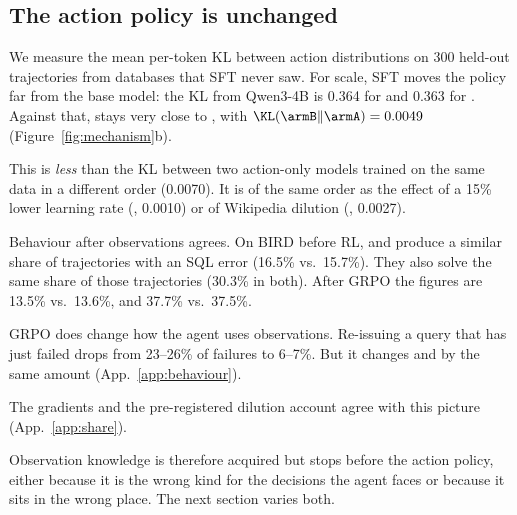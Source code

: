 \subsection{The action policy is unchanged}
\label{sec:equiv}
We measure the mean per-token KL between action distributions on 300 held-out trajectories from databases that SFT never saw. For scale, SFT moves the policy far from the base model: the KL from Qwen3-4B is 0.364 for \armA{} and 0.363 for \armB{}. Against that, \armB{} stays very close to \armA{}, with $\KL(\armB\|\armA)=0.0049$ (Figure~\ref{fig:mechanism}b).

This is \emph{less} than the KL between two action-only models trained on the same data in a different order (0.0070). It is of the same order as the effect of a 15\% lower learning rate (\armC{}, 0.0010) or of Wikipedia dilution (\armD{}, 0.0027).

Behaviour after observations agrees. On BIRD before RL, \armA{} and \armB{} produce a similar share of trajectories with an SQL error (16.5\% vs.\ 15.7\%). They also solve the same share of those trajectories (30.3\% in both). After GRPO the figures are 13.5\% vs.\ 13.6\%, and 37.7\% vs.\ 37.5\%.

GRPO does change how the agent uses observations. Re-issuing a query that has just failed drops from 23--26\% of failures to 6--7\%. But it changes \armA{} and \armB{} by the same amount (App.~\ref{app:behaviour}).

The gradients and the pre-registered dilution account agree with this picture (App.~\ref{app:share}).

Observation knowledge is therefore acquired but stops before the action policy, either because it is the wrong kind for the decisions the agent faces or because it sits in the wrong place. The next section varies both.
